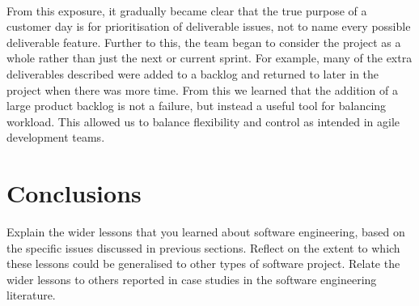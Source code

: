 \documentclass{l3proj}
\begin{document}
\\
From this exposure, it gradually became clear that the true purpose of a customer day is for prioritisation of deliverable issues, not to name every possible deliverable feature. Further to this, the team began to consider the project as a whole rather than just the next or current sprint. For example, many of the extra deliverables described were added to a backlog and returned to later in the project when there was more time. From this we learned that the addition of a large product backlog is not a failure, but instead a useful tool for balancing workload. This allowed us to balance flexibility and control as intended in agile development teams\cite{rising}.


\section{Conclusions}
Explain the wider lessons that you learned about software engineering,
based on the specific issues discussed in previous sections.  Reflect
on the extent to which these lessons could be generalised to other
types of software project.  Relate the wider lessons to others
reported in case studies in the software engineering literature.


\end{document}
